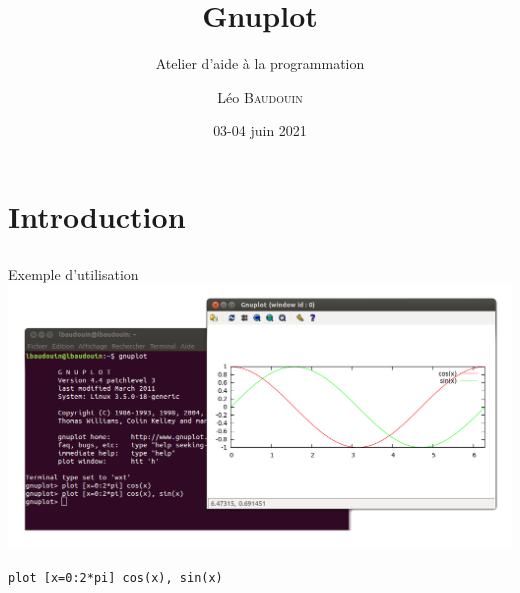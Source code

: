 \documentclass{beamer}
\title{Gnuplot}
\subtitle{Atelier d'aide à la programmation}
\author{L\'eo \textsc{Baudouin}}
\institute{
  {\url{baudouin.leo @ gmail.com}}
}
\date{03-04 juin 2021}
\begin{document}
\begin{frame}
  \titlepage
\end{frame}

\section{Introduction}
\subsection{}

\begin{frame}{Exemple d'utilisation}
\includegraphics[width=\linewidth]{images/gnuplot-exemple}

\begin{center}
\verb?plot [x=0:2*pi] cos(x), sin(x)?
\end{center}
\end{frame}
\end{document}
